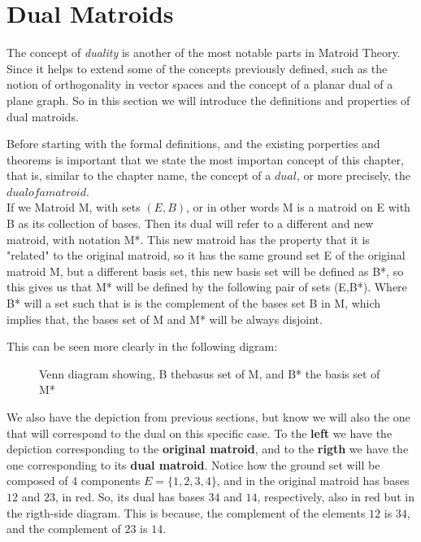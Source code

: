 \section{Dual Matroids}
The concept of \textit{duality} is another of the most notable parts in Matroid Theory. Since it helps to extend some of the concepts previously defined, such as the notion of orthogonality in vector spaces and the concept of a planar dual of a plane graph. So in this section we will introduce the definitions and  properties of dual matroids.

Before starting with the formal definitions, and the existing porperties and theorems is important that we state the most importan concept of this chapter, that is, similar to the chapter name, the concept of a $dual$, or more precisely, the $dual of a matroid$.\\

If we Matroid M, with sets $(E,B)$, or in other words M is a matroid on E with B as its collection of bases. Then its dual will refer to a different and new matroid, with notation M*. This new matroid has the property that it is "related" to the original matroid, so it has the same ground set E of the original matroid M, but a different basis set, this new basis set will be defined as B*, so this gives us that M* will be defined by the following pair of sets (E,B*). Where B* will a set such that is is the complement of the bases set B in M, which implies that, the bases set of M and M* will be always disjoint.

This can be seen more clearly in the following digram:
\begin{figure}[H]
    \centering
{}
\caption{Venn diagram showing, B thebasus set of M, and B* the basis set of M*}%
\label{graphic}%
\end{figure}

We also have the depiction from previous sections, but know we will also the one that will correspond to the dual on this specific case. To the \textbf{left} we have the depiction corresponding to the \textbf{original matroid}, and to the \textbf{rigth} we have the one corresponding to its \textbf{dual matroid}. 
Notice how the ground set will be composed of 4 components $E=\{1,2,3,4\}$, and in the original matroid has bases $12$ and $23$, in red. So, its dual has bases $34$ and $14$, respectively, also in red but in the rigth-side diagram. This is because, the complement of the elements $12$ is $34$, and the complement of $23$ is $14$.


